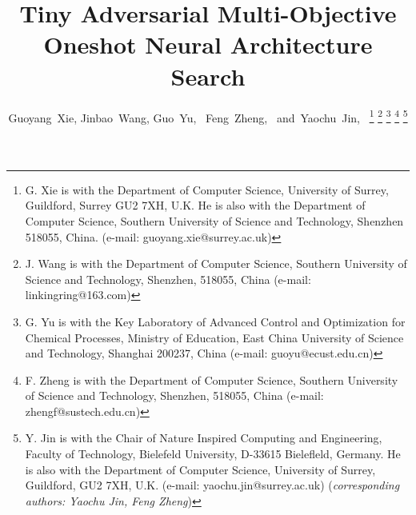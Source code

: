 \documentclass[journal]{IEEEtran}
\begin{document}
\title{Tiny Adversarial Multi-Objective Oneshot Neural Architecture Search}
\author{Guoyang~Xie,
        Jinbao~Wang,
        Guo~Yu,~
        Feng~Zheng,~
        and~Yaochu~Jin,~%
\thanks{G. Xie is with the Department of Computer Science, University of Surrey, Guildford, Surrey GU2 7XH, U.K. He is also with the Department of Computer Science, Southern University of Science and Technology, Shenzhen 518055, China. (e-mail: guoyang.xie@surrey.ac.uk)}%
\thanks{J. Wang is with the Department of Computer Science, Southern University of Science and Technology, Shenzhen, 518055, China (e-mail: linkingring@163.com) }%
\thanks{G. Yu is with the Key Laboratory of Advanced Control and Optimization for Chemical Processes, Ministry of Education, East China University of Science and Technology, Shanghai 200237, China (e-mail: guoyu@ecust.edu.cn) }
\thanks{F. Zheng is with the Department of Computer Science, Southern University of Science and Technology, Shenzhen, 518055, China (e-mail: zhengf@sustech.edu.cn) }
\thanks{Y. Jin is with the Chair of Nature Inspired Computing and Engineering, Faculty of Technology, Bielefeld University, D-33615 Bielefleld, Germany. He is also with the Department of Computer Science, University of Surrey, Guildford, GU2 7XH, U.K.  (e-mail: yaochu.jin@surrey.ac.uk) (\textit{corresponding authors: Yaochu Jin, Feng Zheng})}
}

\maketitle
\end{document}
